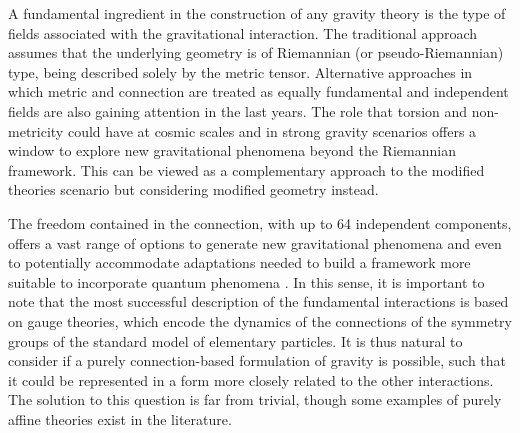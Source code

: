A fundamental ingredient in the construction of any gravity theory is the type of fields associated with the gravitational interaction. The traditional approach assumes that the underlying geometry is of Riemannian (or pseudo-Riemannian) type, being described solely by the metric tensor. Alternative approaches in which metric and connection are treated as equally fundamental and independent fields are also gaining attention in the last years. The role that torsion and non-metricity could have at cosmic scales and in strong gravity scenarios offers a window to explore new gravitational phenomena beyond the Riemannian framework. This can be viewed as a complementary approach to the modified theories scenario but considering modified geometry instead. 

The freedom contained in the connection, with up to 64 independent components, offers a vast range of options to generate new gravitational phenomena and even to potentially accommodate adaptations needed to build a framework more suitable to incorporate quantum phenomena \cite{Hehl:1994ue}. In this sense, it is important to note that the most successful description of the fundamental interactions is based on gauge theories, which encode the dynamics of the connections of the symmetry groups of the standard model of elementary particles. It is thus natural to consider if a purely connection-based formulation of gravity is possible, such that it could be represented in a form more closely related to the other interactions. The solution to this question is far from trivial, though some examples of purely affine theories exist in the literature.  

